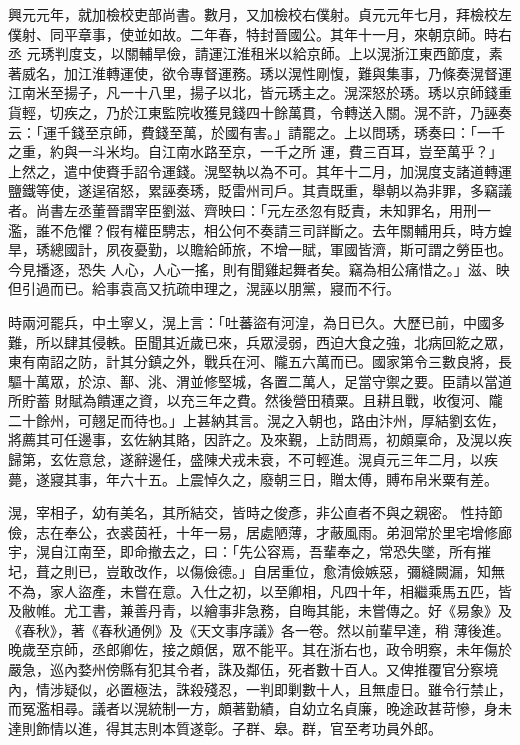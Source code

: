 \begin{pinyinscope}
 興元元年，就加檢校吏部尚書。數月，又加檢校右僕射。貞元元年七月，拜檢校左僕射、同平章事，使並如故。二年春，特封晉國公。其年十一月，來朝京師。時右丞
 元琇判度支，以關輔旱儉，請運江淮租米以給京師。上以滉浙江東西節度，素著威名，加江淮轉運使，欲令專督運務。琇以滉性剛愎，難與集事，乃條奏滉督運江南米至揚子，凡一十八里，揚子以北，皆元琇主之。滉深怒於琇。琇以京師錢重貨輕，切疾之，乃於江東監院收獲見錢四十餘萬貫，令轉送入關。滉不許，乃誣奏云：「運千錢至京師，費錢至萬，於國有害。」請罷之。上以問琇，琇奏曰：「一千之重，約與一斗米均。自江南水路至京，一千之所
 運，費三百耳，豈至萬乎？」上然之，遣中使賚手詔令運錢。滉堅執以為不可。其年十二月，加滉度支諸道轉運鹽鐵等使，遂逞宿怒，累誣奏琇，貶雷州司戶。其責既重，舉朝以為非罪，多竊議者。尚書左丞董晉謂宰臣劉滋、齊映曰：「元左丞忽有貶責，未知罪名，用刑一濫，誰不危懼？假有權臣騁志，相公何不奏請三司詳斷之。去年關輔用兵，時方蝗旱，琇總國計，夙夜憂勤，以贍給師旅，不增一賦，軍國皆濟，斯可謂之勞臣也。今見播逐，恐失
 人心，人心一搖，則有聞雞起舞者矣。竊為相公痛惜之。」滋、映但引過而已。給事袁高又抗疏申理之，滉誣以朋黨，寢而不行。



 時兩河罷兵，中土寧乂，滉上言：「吐蕃盜有河湟，為日已久。大歷已前，中國多難，所以肆其侵軼。臣聞其近歲已來，兵眾浸弱，西迫大食之強，北病回紇之眾，東有南詔之防，計其分鎮之外，戰兵在河、隴五六萬而已。國家第令三數良將，長驅十萬眾，於涼、鄯、洮、渭並修堅城，各置二萬人，足當守禦之要。臣請以當道所貯蓄
 財賦為饋運之資，以充三年之費。然後營田積粟。且耕且戰，收復河、隴二十餘州，可翹足而待也。」上甚納其言。滉之入朝也，路由汴州，厚結劉玄佐，將薦其可任邊事，玄佐納其賂，因許之。及來覲，上訪問焉，初頗稟命，及滉以疾歸第，玄佐意怠，遂辭邊任，盛陳犬戎未衰，不可輕進。滉貞元三年二月，以疾薨，遂寢其事，年六十五。上震悼久之，廢朝三日，贈太傅，賻布帛米粟有差。



 滉，宰相子，幼有美名，其所結交，皆時之俊彥，非公直者不與之親密。
 性持節儉，志在奉公，衣裘茵衽，十年一易，居處陋薄，才蔽風雨。弟洄常於里宅增修廊宇，滉自江南至，即命撤去之，曰：「先公容焉，吾輩奉之，常恐失墜，所有摧圮，葺之則已，豈敢改作，以傷儉德。」自居重位，愈清儉嫉惡，彌縫闕漏，知無不為，家人盜產，未嘗在意。入仕之初，以至卿相，凡四十年，相繼乘馬五匹，皆及敝帷。尤工書，兼善丹青，以繪事非急務，自晦其能，未嘗傳之。好《易象》及《春秋》，著《春秋通例》及《天文事序議》各一卷。然以前輩早達，稍
 薄後進。晚歲至京師，丞郎卿佐，接之頗倨，眾不能平。其在浙右也，政令明察，未年傷於嚴急，巡內婺州傍縣有犯其令者，誅及鄰伍，死者數十百人。又俾推覆官分察境內，情涉疑似，必置極法，誅殺殘忍，一判即剿數十人，且無虛日。雖令行禁止，而冤濫相尋。議者以滉統制一方，頗著勤績，自幼立名貞廉，晚途政甚苛慘，身未達則飾情以進，得其志則本質遂彰。子群、皋。群，官至考功員外郎。




\end{pinyinscope}
